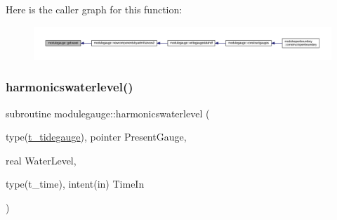 Here is the caller graph for this function\+:\nopagebreak
\begin{figure}[H]
\begin{center}
\leavevmode
\includegraphics[width=350pt]{namespacemodulegauge_af6c96743755f8c096eb5335e0993e175_icgraph}
\end{center}
\end{figure}
\mbox{\label{namespacemodulegauge_a7de5a32e5ee02eaed3c8a598bbb65cb9}} 
\subsubsection{\texorpdfstring{harmonicswaterlevel()}{harmonicswaterlevel()}}
{\footnotesize\ttfamily subroutine modulegauge\+::harmonicswaterlevel (\begin{DoxyParamCaption}\item[{type(\mbox{\hyperlink{structmodulegauge_1_1t__tidegauge}{t\+\_\+tidegauge}}), pointer}]{Present\+Gauge,  }\item[{real}]{Water\+Level,  }\item[{type(t\+\_\+time), intent(in)}]{Time\+In }\end{DoxyParamCaption})\hspace{0.3cm}{\ttfamily [private]}}

